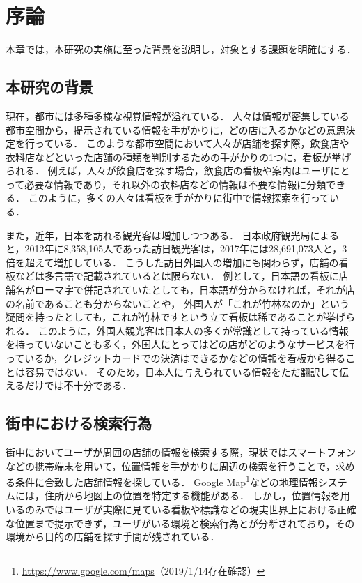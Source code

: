 \chapter{序論}
\label{chapter:introduction}

本章では，本研究の実施に至った背景を説明し，対象とする課題を明確にする．

\section{本研究の背景}
  現在，都市には多種多様な視覚情報が溢れている．
  人々は情報が密集している都市空間から，提示されている情報を手がかりに，どの店に入るかなどの意思決定を行っている．
  このような都市空間において人々が店舗を探す際，飲食店や衣料店などといった店舗の種類を判別するための手がかりの1つに，看板が挙げられる．
  例えば，人々が飲食店を探す場合，飲食店の看板や案内はユーザにとって必要な情報であり，それ以外の衣料店などの情報は不要な情報に分類できる．
  このように，多くの人々は看板を手がかりに街中で情報探索を行っている．

  また，近年，日本を訪れる観光客は増加しつつある．
  日本政府観光局によると，2012年に8,358,105人であった訪日観光客は，2017年には28,691,073人と，3倍を超えて増加している\cite{JNTO:2018}．
  こうした訪日外国人の増加にも関わらず，店舗の看板などは多言語で記載されているとは限らない．
  例として，日本語の看板に店舗名がローマ字で併記されていたとしても，日本語が分からなければ，それが店の名前であることも分からないことや，
  外国人が「これが竹林なのか」という疑問を持ったとしても，これが竹林ですという立て看板は稀であることが挙げられる．
  このように，外国人観光客は日本人の多くが常識として持っている情報を持っていないことも多く，外国人にとってはどの店がどのようなサービスを行っているか，クレジットカードでの決済はできるかなどの情報を看板から得ることは容易ではない．
  そのため，日本人に与えられている情報をただ翻訳して伝えるだけでは不十分である\cite{Hayashida:2005}．

\section{街中における検索行為}
\label{section:searching_action}
  街中においてユーザが周囲の店舗の情報を検索する際，現状ではスマートフォンなどの携帯端末を用いて，位置情報を手がかりに周辺の検索を行うことで，求める条件に合致した店舗情報を探している．
  Google Map\footnote{\url{https://www.google.com/maps}（2019/1/14存在確認）}などの地理情報システムには，住所から地図上の位置を特定する機能がある．
  しかし，位置情報を用いるのみではユーザが実際に見ている看板や標識などの現実世界上における正確な位置まで提示できず，ユーザがいる環境と検索行為とが分断されており，その環境から目的の店舗を探す手間が残されている．
  
